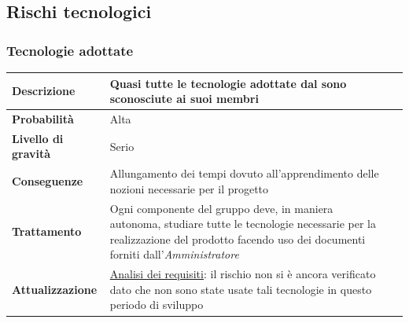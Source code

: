 \subsection{Rischi tecnologici}
\subsubsection{Tecnologie adottate}

\begin{center}
	
	\begin{tabular}{|>{\centering}m{4cm} ||>{\centering}m{8cm} |>{\centering\arraybackslash}m{0pt}@{}|}
		\hline
		 \textbf{Descrizione} & Quasi tutte le tecnologie adottate dal \glossario{team} sono sconosciute ai suoi membri & \\[2ex]
		 \hline	
		\textbf{Probabilità} & Alta &\\[1ex]
		\hline
		\textbf{Livello di gravità} & Serio & \\[1ex]
		\hline
		\textbf{Conseguenze} & Allungamento dei tempi dovuto all'apprendimento delle nozioni necessarie per il progetto & \\[1ex]
		\hline
		 \textbf{Trattamento} & Ogni componente del gruppo deve, in maniera autonoma, studiare tutte le tecnologie necessarie per la realizzazione del prodotto facendo uso dei documenti forniti dall’\emph{Amministratore} & \\[1ex] 
		 \hline
		 \textbf{Attualizzazione} & \underline{Analisi dei requisiti}: il rischio non si è ancora verificato dato che non sono state
		 usate tali tecnologie in questo periodo di sviluppo & \\[1ex]
		 \hline
	\end{tabular}
	
\end{center}


